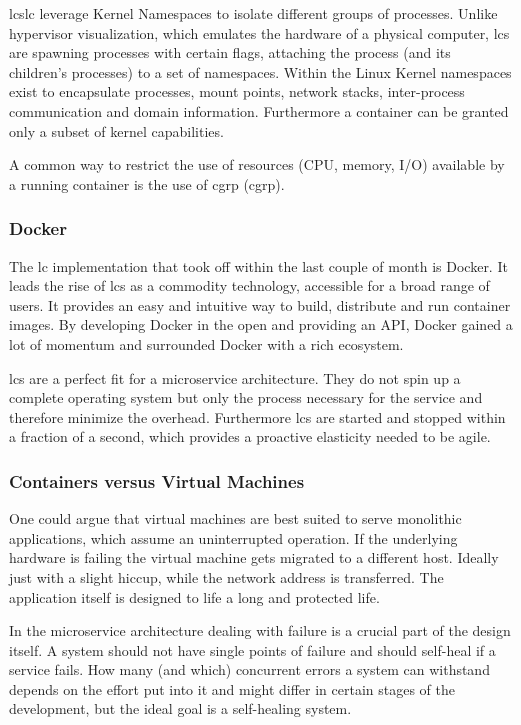 \glspl{lc}\glsdesc{lc} leverage Kernel Namespaces to isolate different groups of processes. Unlike hypervisor visualization, which emulates
the hardware of a physical computer, \glspl{lc} are spawning processes with certain flags, attaching the process (and its children's processes)
to a set of namespaces. Within the Linux Kernel namespaces exist to encapsulate processes, mount points, network stacks,
inter-process communication and domain information. Furthermore a container can be granted only a subset of kernel capabilities.

A common way to restrict the use of resources (CPU, memory, I/O) available by a running container is the use of \gls{cgrp} (\glsdesc{cgrp}).

\subsubsection{Docker}
The \gls{lc} implementation that took off within the last couple of month is Docker. It leads the rise of \glspl{lc} as a commodity technology, accessible
for a broad range of users. It provides an easy and intuitive way to build, distribute and run container images.
By developing Docker in the open and providing an API, Docker gained a lot of momentum and surrounded Docker with a rich ecosystem.

\glspl{lc} are a perfect fit for a microservice architecture. They do not spin up a complete operating system but only the process
necessary for the service and therefore minimize the overhead. Furthermore \glspl{lc} are started and stopped within a
fraction of a second, which provides a proactive elasticity needed to be agile.

\subsubsection{Containers versus Virtual Machines}
One could argue that virtual machines are best suited to serve monolithic applications,
which assume an uninterrupted operation. If the underlying hardware is failing the virtual machine gets migrated to a different host. Ideally just
with a slight hiccup, while the network address is transferred. The application itself is designed to life a long and protected life.

In the microservice architecture dealing with failure is a crucial part of the design itself. A system should not have single points of failure and
should self-heal if a service fails. How many (and which) concurrent errors a system can withstand depends on the effort put into it and might differ
in certain stages of the development, but the ideal goal is a self-healing system.


